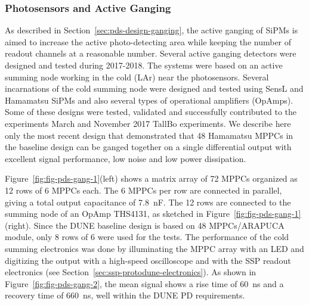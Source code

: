 \subsubsection{Photosensors and Active Ganging}
\label{sec:pds-valid-ganging}

As described in Section~\ref{sec:pds-design-ganging}, the active ganging of SiPMs is aimed to increase the active photo-detecting area while keeping the number of readout channels at a reasonable number. 
Several active ganging detectors were designed and tested during 2017-2018. 
The systems were based on an active summing node working in the cold (LAr) near the photosensors. Several incarnations of the cold summing node were designed and tested using SensL and Hamamatsu SiPMs and also several types of operational amplifiers (OpAmps). 
Some of these designs were tested, validated and successfully contributed to the experiments March and November 2017 TallBo experiments.  
We describe here only the most recent design that demonstrated that 48 Hamamatsu MPPCs in the baseline design can be ganged together on a single differential output with excellent signal performance, low noise and low power dissipation.

Figure~\ref{fig:fig-pds-gang-1}(left) shows a matrix array of 72 MPPCs organized as 12 rows of 6 MPPCs each. 
The 6 MPPCs per row are connected in parallel, giving a total output capacitance of \SI{7.8}{nF}. The 12 rows are connected to the summing node of an OpAmp THS4131, as sketched in Figure~\ref{fig:fig-pds-gang-1}(right). 
Since the DUNE baseline design is based on 48 MPPCs/ARAPUCA module, only 8 rows of 6 were used for the tests. 
The performance of the cold summing electronics was done by illuminating the MPPC array with an LED and digitizing the output with a high-speed oscilloscope and with the SSP readout electronics (see Section~\ref{sec:ssp-protodune-electronics}).
As shown in Figure~\ref{fig:fig-pds-gang-2}, the mean signal shows a rise time of \SI{60}{ns} and a recovery time of \SI{660}{ns}, well within the DUNE PD requirements.

